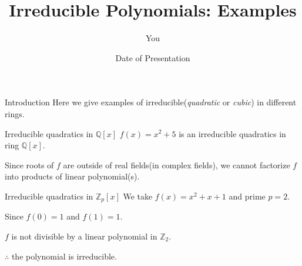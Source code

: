 \documentclass{beamer}
\title{Irreducible Polynomials: Examples}
\author{You}
\date{Date of Presentation}
\begin{document}
\begin{frame}
  \titlepage
\end{frame}

\begin{frame}{Introduction}
Here we give examples of irreducible(\textit{quadratic} or \textit{cubic}) in different rings.
\end{frame}


\begin{frame}{Irreducible quadratics in $\mathbb{Q}[x]$}
$f(x) = x^2+5$ is an irreducible quadratics in ring $\mathbb{Q}[x]$.

Since roots of $f$ are outside of real fields(in complex fields), we cannot factorize $f$ into products of linear polynomial(s).
\end{frame}


\begin{frame}{Irreducible quadratics in $\mathbb{Z}_p[x]$}
We take $f(x) = x^2+x+1$ and prime $p=2$.

Since $f(0)=1$ and $f(1)= 1$.

\vspace{5pt}
$f$ is not divisible by a linear polynomial in $\mathbb{Z}_2$.

$\therefore$ the polynomial is irreducible.
\end{frame}








\end{document}
